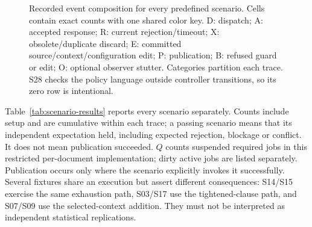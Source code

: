 \documentclass[pdflatex,sn-mathphys-num]{sn-jnl}
\theoremstyle{thmstyleone}
\theoremstyle{thmstylethree}
\theoremstyle{thmstyletwo}
\begin{document}
\begin{figure}[tbp]
\caption{Recorded event composition for every predefined scenario. Cells contain exact counts with one shared color key. D: dispatch; A: accepted response; R: current rejection/timeout; X: obsolete/duplicate discard; E: committed source/context/configuration edit; P: publication; B: refused guard or edit; O: optional observer stutter. Categories partition each trace. S28 checks the policy language outside controller transitions, so its zero row is intentional.}\label{fig:scenario-heatmap}
\end{figure}

Table~\ref{tab:scenario-results} reports every scenario separately. Counts include setup and are cumulative within each trace; a passing scenario means that its independent expectation held, including expected rejection, blockage or conflict. It does not mean publication succeeded. $Q$ counts suspended required jobs in this restricted per-document implementation; dirty active jobs are listed separately. Publication occurs only where the scenario explicitly invokes it successfully. Several fixtures share an execution but assert different consequences: S14/S15 exercise the same exhaustion path, S03/S17 use the tightened-clause path, and S07/S09 use the selected-context addition. They must not be interpreted as independent statistical replications.
\end{document}

